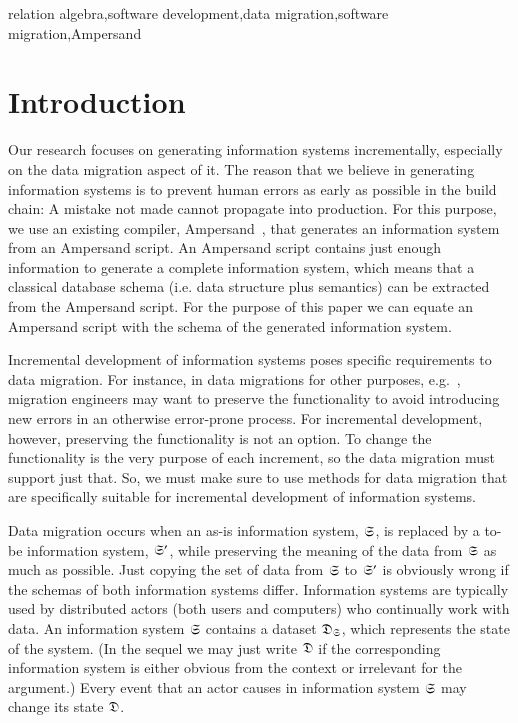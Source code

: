 \documentclass{elsarticle}
\begin{document}
\begin{keyword}
relation algebra\sep software development\sep data migration\sep software migration\sep Ampersand
\end{keyword}
\maketitle

\section{Introduction}
\label{sct:Introduction}
   Our research focuses on generating information systems incrementally,
   especially on the data migration aspect of it.
   The reason that we believe in generating information systems is to prevent human errors as early as possible in the build chain:
   A mistake not made cannot propagate into production.
   For this purpose, we use an existing compiler, Ampersand~\cite{Joosten-JLAMP2018},
   that generates an information system from an Ampersand script.
   An Ampersand script contains just enough information to generate a complete information system,
   which means that a classical database schema (i.e. data structure plus semantics) can be extracted from the Ampersand script.
   For the purpose of this paper we can equate an Ampersand script with the schema of the generated information system.
   
   Incremental development of information systems poses specific requirements to data migration.
   For instance, in data migrations for other purposes,
   e.g.~\cite{Gholami2016,Bisbal1999},
   migration engineers may want to preserve the functionality to avoid introducing new errors in an otherwise error-prone process.
   For incremental development, however, preserving the functionality is not an option.
   To change the functionality is the very purpose of each increment, so the data migration must support just that.
   So, we must make sure to use methods for data migration that are specifically suitable for incremental development of information systems.
   
   Data migration occurs when an as-is information system, $\mathfrak{S}$, is replaced by a to-be information system, $\mathfrak{S}'$,
   while preserving the meaning of the data from $\mathfrak{S}$ as much as possible.
   Just copying the set of data from $\mathfrak{S}$ to $\mathfrak{S}'$ is obviously wrong if the schemas of both information systems differ.
   Information systems are typically used by distributed actors (both users and computers) who continually work with data.
   An information system $\mathfrak{S}$ contains a dataset $\mathfrak{D}_{\mathfrak{S}}$, which represents the state of the system.
   (In the sequel we may just write $\mathfrak{D}$
   if the corresponding information system is either obvious from the context or irrelevant for the argument.)
   Every event that an actor causes in information system $\mathfrak{S}$ may change its state $\mathfrak{D}$.
\end{document}
